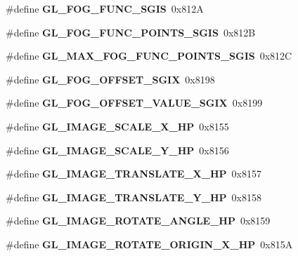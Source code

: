 \begin{DoxyCompactItemize}
\item 
\#define {\bfseries G\+L\+\_\+\+F\+O\+G\+\_\+\+F\+U\+N\+C\+\_\+\+S\+G\+I\+S}~0x812\+A\label{_s_d_l__opengl_8h_ac1eddc280cee434e9f2dbc34e2434b79}

\item 
\#define {\bfseries G\+L\+\_\+\+F\+O\+G\+\_\+\+F\+U\+N\+C\+\_\+\+P\+O\+I\+N\+T\+S\+\_\+\+S\+G\+I\+S}~0x812\+B\label{_s_d_l__opengl_8h_a1de41cbd1e5dede6b9a8ea858adb78d6}

\item 
\#define {\bfseries G\+L\+\_\+\+M\+A\+X\+\_\+\+F\+O\+G\+\_\+\+F\+U\+N\+C\+\_\+\+P\+O\+I\+N\+T\+S\+\_\+\+S\+G\+I\+S}~0x812\+C\label{_s_d_l__opengl_8h_a21a9c04b548039de1302baaf47bb56c1}

\item 
\#define {\bfseries G\+L\+\_\+\+F\+O\+G\+\_\+\+O\+F\+F\+S\+E\+T\+\_\+\+S\+G\+I\+X}~0x8198\label{_s_d_l__opengl_8h_a98b5908055b0a28f17b84a9c0193aef5}

\item 
\#define {\bfseries G\+L\+\_\+\+F\+O\+G\+\_\+\+O\+F\+F\+S\+E\+T\+\_\+\+V\+A\+L\+U\+E\+\_\+\+S\+G\+I\+X}~0x8199\label{_s_d_l__opengl_8h_a00137dbb4d51895d9d8ff31feba295bc}

\item 
\#define {\bfseries G\+L\+\_\+\+I\+M\+A\+G\+E\+\_\+\+S\+C\+A\+L\+E\+\_\+\+X\+\_\+\+H\+P}~0x8155\label{_s_d_l__opengl_8h_ace2f80aeb1328b384a85b216c6db1822}

\item 
\#define {\bfseries G\+L\+\_\+\+I\+M\+A\+G\+E\+\_\+\+S\+C\+A\+L\+E\+\_\+\+Y\+\_\+\+H\+P}~0x8156\label{_s_d_l__opengl_8h_adb58b01b5d70006dab08615daf702bf8}

\item 
\#define {\bfseries G\+L\+\_\+\+I\+M\+A\+G\+E\+\_\+\+T\+R\+A\+N\+S\+L\+A\+T\+E\+\_\+\+X\+\_\+\+H\+P}~0x8157\label{_s_d_l__opengl_8h_a013394211449666f17b23151c56ac7ff}

\item 
\#define {\bfseries G\+L\+\_\+\+I\+M\+A\+G\+E\+\_\+\+T\+R\+A\+N\+S\+L\+A\+T\+E\+\_\+\+Y\+\_\+\+H\+P}~0x8158\label{_s_d_l__opengl_8h_add3ec614937a860af340f17d72452bac}

\item 
\#define {\bfseries G\+L\+\_\+\+I\+M\+A\+G\+E\+\_\+\+R\+O\+T\+A\+T\+E\+\_\+\+A\+N\+G\+L\+E\+\_\+\+H\+P}~0x8159\label{_s_d_l__opengl_8h_a7b509514c581b7bdbf817bcc55d6ce74}

\item 
\#define {\bfseries G\+L\+\_\+\+I\+M\+A\+G\+E\+\_\+\+R\+O\+T\+A\+T\+E\+\_\+\+O\+R\+I\+G\+I\+N\+\_\+\+X\+\_\+\+H\+P}~0x815\+A\label{_s_d_l__opengl_8h_a2d3e9223931ab5829ee9e62ecc09d335}


\end{DoxyCompactItemize}
